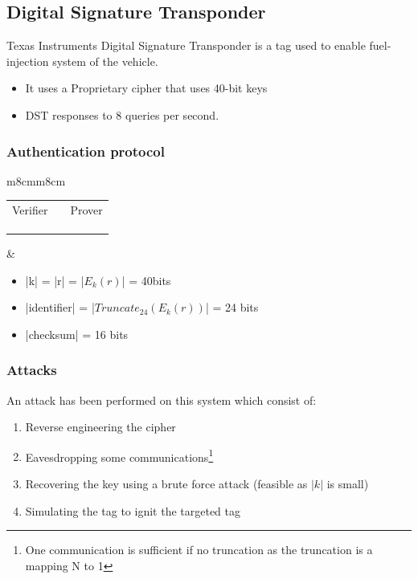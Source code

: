 \subsection{Digital Signature Transponder}


Texas Instruments Digital Signature Transponder is a tag used to enable 
fuel-injection system of the vehicle.
\begin{itemize}
	\item It uses a Proprietary cipher that uses 40-bit keys
	\item DST responses to 8 queries per second.
\end{itemize}

\subsubsection{Authentication protocol}
\begin{tabular}{m{8cm}m{8cm}}
    \begin{tabular}{ccc}
        Verifier & & Prover \\
                 &\fr{r} & \\
        \\
        & \fl{id, $Trunc_{24}(E_k(r))$, checksum} \\
    \end{tabular}
    &
    \begin{itemize}
        \item |k| = |r| = |$E_k(r)$| = 40bits
        \item |identifier| = |$Truncate_{24}(E_k(r))$| = 24 bits
        \item |checksum| = 16 bits
    \end{itemize}
\end{tabular}

\subsubsection{Attacks}
An attack has been performed on this system which consist of:
\begin{enumerate}
	\item Reverse engineering the cipher
	\item Eavesdropping some communications\footnote{One communication is
    sufficient if no truncation as the truncation is a mapping N to 1}
	\item Recovering the key using a brute force attack (feasible as $|k|$ is small)
	\item Simulating the tag to ignit the targeted tag
\end{enumerate}
